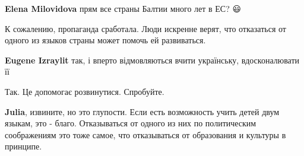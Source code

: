 \begin{itemize}
\begin{itemize}
 
\textbf{Elena Milovidova} прям все страны Балтии много лет в ЕС? 😃

\end{itemize}

 

К сожалению, пропаганда сработала. Люди искренне верят, что отказаться от
одного из языков страны может помочь ей развиваться.

\begin{itemize}
 
\textbf{Eugene Izraylit} так, і вперто відмовляються вчити українську, вдосконалювати її

 
Так. Це допомогає розвинутися.
Спробуйте.

 
\textbf{Julia}, извините, но это глупости. Если есть возможность учить детей
двум языкам, это - благо. Отказываться от одного из них по политическим
соображениям это тоже самое, что отказываться от образования и культуры в
принципе.

 


\end{itemize}
\end{itemize}
